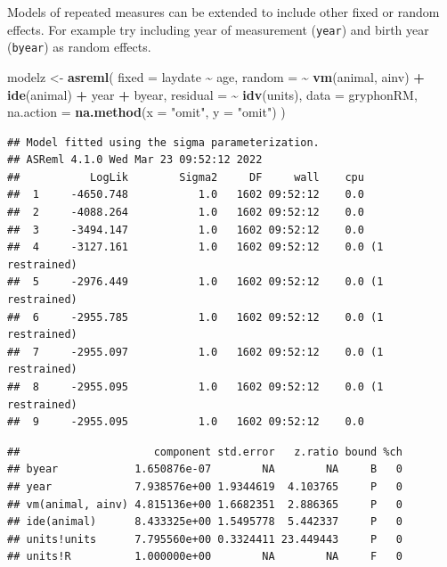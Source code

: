 \documentclass[
  12pt,
]{book}
\newenvironment{Shaded}{\begin{snugshade}}{\end{snugshade}}
\newcommand{\DataTypeTok}[1]{\textcolor[rgb]{0.13,0.29,0.53}{#1}}
\newcommand{\KeywordTok}[1]{\textcolor[rgb]{0.13,0.29,0.53}{\textbf{#1}}}
\newcommand{\NormalTok}[1]{#1}
\newcommand{\OperatorTok}[1]{\textcolor[rgb]{0.81,0.36,0.00}{\textbf{#1}}}
\newcommand{\StringTok}[1]{\textcolor[rgb]{0.31,0.60,0.02}{#1}}
\begin{document}
Models of repeated measures can be extended to include other fixed or random effects. For example try including year of measurement (\texttt{year}) and birth year (\texttt{byear}) as random effects.

\begin{Shaded}
\begin{Highlighting}[]
\NormalTok{modelz \textless{}{-}}\StringTok{ }\KeywordTok{asreml}\NormalTok{(}
  \DataTypeTok{fixed =}\NormalTok{ laydate }\OperatorTok{\textasciitilde{}}\StringTok{ }\NormalTok{age,}
  \DataTypeTok{random =} \OperatorTok{\textasciitilde{}}\StringTok{ }\KeywordTok{vm}\NormalTok{(animal, ainv) }\OperatorTok{+}\StringTok{ }\KeywordTok{ide}\NormalTok{(animal) }\OperatorTok{+}
\StringTok{    }\NormalTok{year }\OperatorTok{+}\StringTok{ }\NormalTok{byear,}
  \DataTypeTok{residual =} \OperatorTok{\textasciitilde{}}\StringTok{ }\KeywordTok{idv}\NormalTok{(units),}
  \DataTypeTok{data =}\NormalTok{ gryphonRM,}
  \DataTypeTok{na.action =} \KeywordTok{na.method}\NormalTok{(}\DataTypeTok{x =} \StringTok{"omit"}\NormalTok{, }\DataTypeTok{y =} \StringTok{"omit"}\NormalTok{)}
\NormalTok{)}
\end{Highlighting}
\end{Shaded}

\begin{verbatim}
## Model fitted using the sigma parameterization.
## ASReml 4.1.0 Wed Mar 23 09:52:12 2022
##           LogLik        Sigma2     DF     wall    cpu
##  1     -4650.748           1.0   1602 09:52:12    0.0
##  2     -4088.264           1.0   1602 09:52:12    0.0
##  3     -3494.147           1.0   1602 09:52:12    0.0
##  4     -3127.161           1.0   1602 09:52:12    0.0 (1 restrained)
##  5     -2976.449           1.0   1602 09:52:12    0.0 (1 restrained)
##  6     -2955.785           1.0   1602 09:52:12    0.0 (1 restrained)
##  7     -2955.097           1.0   1602 09:52:12    0.0 (1 restrained)
##  8     -2955.095           1.0   1602 09:52:12    0.0 (1 restrained)
##  9     -2955.095           1.0   1602 09:52:12    0.0
\end{verbatim}

\begin{Shaded}
\end{Shaded}

\begin{verbatim}
##                     component std.error   z.ratio bound %ch
## byear            1.650876e-07        NA        NA     B   0
## year             7.938576e+00 1.9344619  4.103765     P   0
## vm(animal, ainv) 4.815136e+00 1.6682351  2.886365     P   0
## ide(animal)      8.433325e+00 1.5495778  5.442337     P   0
## units!units      7.795560e+00 0.3324411 23.449443     P   0
## units!R          1.000000e+00        NA        NA     F   0
\end{verbatim}
\end{document}

